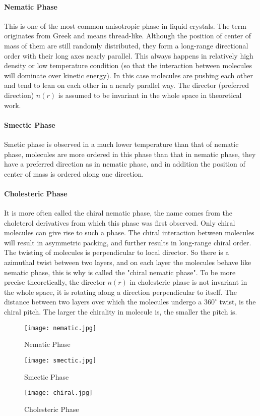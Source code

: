 \paragraph{Nematic Phase}
This is one of the most common anisotropic phase in liquid crystals. The term originates from Greek and means thread-like. Although the position of center of mass of them are still randomly distributed, they form a long-range directional order with their long axes nearly parallel. This always happens in relatively high density or low temperature condition (so that the interaction between molecules will dominate over kinetic energy). In this case molecules are pushing each other and tend to lean on each other in a nearly parallel way. The director (preferred direction) $n(r)$ is assumed to be invariant in the whole space in theoretical work.

\paragraph{Smectic Phase}
Smetic phase is observed in a much lower temperature than that of nematic phase, molecules are more ordered in this phase than that in nematic phase, they have a preferred direction as in nematic phase, and in addition the position of center of mass is ordered along one direction.

\paragraph{Cholesteric Phase}
It is more often called the chiral nematic phase, the name comes from the choleterol derivatives from which this phase was first observed. Only chiral molecules can give rise to such a phase. The chiral interaction between molecules will result in asymmetric packing, and further results in long-range chiral order. The twisting of molecules is perpendicular to local director. So there is a azimuthal twist between two layers, and on each layer the molecules behave like nematic phase, this is why is called the "chiral nematic phase". To be more precise theoretically, the director $n(r)$ in cholesteric phase is not invariant in the whole space, it is rotating along a direction perpendicular to itself. The distance between two layers over which the molecules undergo a $360^\circ$ twist, is the chiral pitch. The larger the chirality in molecule is, the smaller the pitch is.

\begin{figure}[H]
	\begin{minipage}{0.32\textwidth}
		\centering
		\texttt{[image: nematic.jpg]}
		\caption{Nematic Phase}
		\label{fig:nematic}
	\end{minipage}
	\begin{minipage}{0.32\textwidth}
 		\centering
 		\texttt{[image: smectic.jpg]}
 		\caption{Smectic Phase}
 		\label{fig:smetic}
 	\end{minipage}
 	\begin{minipage}{0.32\textwidth}
 		\centering
 		\texttt{[image: chiral.jpg]}
 		\caption{Cholesteric Phase}
 		\label{fig:chiral}
 	\end{minipage}
\end{figure}

